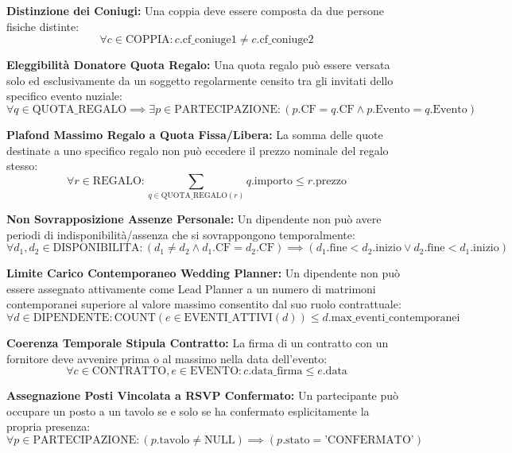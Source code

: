 \begin{enumerate}[label=\textbf{[V-\arabic*]}]
    \item \textbf{Distinzione dei Coniugi:} Una coppia deve essere composta da due persone fisiche distinte:
    \[ \forall c \in \text{COPPIA} : c.\text{cf\_coniuge1} \neq c.\text{cf\_coniuge2} \]
    
    \item \textbf{Eleggibilità Donatore Quota Regalo:} Una quota regalo può essere versata solo ed esclusivamente da un soggetto regolarmente censito tra gli invitati dello specifico evento nuziale:
    \[ \forall q \in \text{QUOTA\_REGALO} \implies \exists p \in \text{PARTECIPAZIONE} : (p.\text{CF} = q.\text{CF} \land p.\text{Evento} = q.\text{Evento}) \]
    
    \item \textbf{Plafond Massimo Regalo a Quota Fissa/Libera:} La somma delle quote destinate a uno specifico regalo non può eccedere il prezzo nominale del regalo stesso:
    \[ \forall r \in \text{REGALO} : \sum_{q \in \text{QUOTA\_REGALO}(r)} q.\text{importo} \le r.\text{prezzo} \]
    
    \item \textbf{Non Sovrapposizione Assenze Personale:} Un dipendente non può avere periodi di indisponibilità/assenza che si sovrappongono temporalmente:
    \[ \forall d_1, d_2 \in \text{DISPONIBILITA} : (d_1 \neq d_2 \land d_1.\text{CF} = d_2.\text{CF}) \implies (d_1.\text{fine} < d_2.\text{inizio} \lor d_2.\text{fine} < d_1.\text{inizio}) \]
    
    \item \textbf{Limite Carico Contemporaneo Wedding Planner:} Un dipendente non può essere assegnato attivamente come Lead Planner a un numero di matrimoni contemporanei superiore al valore massimo consentito dal suo ruolo contrattuale:
    \[ \forall d \in \text{DIPENDENTE} : \text{COUNT}(e \in \text{EVENTI\_ATTIVI}(d)) \le d.\text{max\_eventi\_contemporanei} \]
    
    \item \textbf{Coerenza Temporale Stipula Contratto:} La firma di un contratto con un fornitore deve avvenire prima o al massimo nella data dell'evento:
    \[ \forall c \in \text{CONTRATTO}, e \in \text{EVENTO} : c.\text{data\_firma} \le e.\text{data} \]
    
    \item \textbf{Assegnazione Posti Vincolata a RSVP Confermato:} Un partecipante può occupare un posto a un tavolo se e solo se ha confermato esplicitamente la propria presenza:
    \[ \forall p \in \text{PARTECIPAZIONE} : (p.\text{tavolo} \neq \text{NULL}) \implies (p.\text{stato} = \text{'CONFERMATO'}) \]
    

\end{enumerate}
